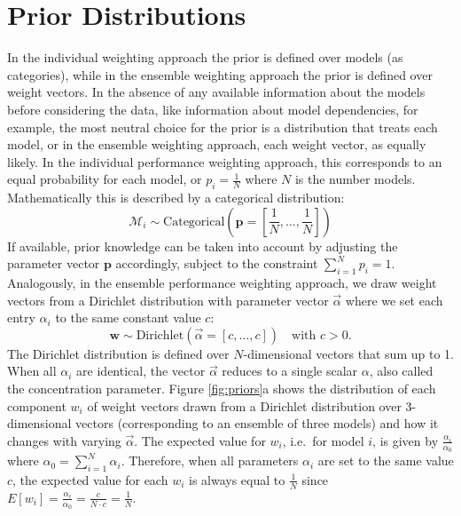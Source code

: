 \section{Prior Distributions}\label{sec:priors}
In the individual weighting approach the prior is defined over models (as categories), while in the ensemble weighting approach the prior is defined over weight vectors.
In the absence of any available information about the models before considering the data, like information about model dependencies, for example, the most neutral choice for the prior is a distribution that treats each model, or in the ensemble weighting approach, each weight vector, as equally likely.
In the individual performance weighting approach, this corresponds to an equal probability for each model, or $p_i = \frac{1}{N}$ where $N$ is the number models. Mathematically this is described by a categorical distribution:
\begin{equation}\label{eq:prior-individual} 
    \mathcal{M}_i \sim \textrm{Categorical}(\mathbf{p}=\left[\frac{1}{N},\dots,\frac{1}{N}\right])
\end{equation}
If available, prior knowledge can be taken into account by adjusting the parameter vector $\mathbf{p}$ accordingly, subject to the constraint $\sum_{i=1}^N p_i = 1$.
Analogously,  in the ensemble performance weighting approach, we draw weight vectors from a Dirichlet distribution with parameter vector $\vec{\alpha}$ where we set each entry $\alpha_i$ to the same constant value $c$:
\begin{equation}\label{eq:prior-ensemble}  
    \mathbf{w} \sim \textrm{Dirichlet}(\vec{\alpha} = \left[c,\dots,c\right]) \quad \textrm{with }  c>0.
\end{equation}
%
The Dirichlet distribution is defined over $N$-dimensional vectors that sum up to 1. 
When all $\alpha_i$ are identical, the vector $\vec{\alpha}$ reduces to a single scalar $\alpha$, also called the concentration parameter.
Figure \ref{fig:priors}a shows the distribution of each component $w_i$ of weight vectors drawn from a Dirichlet distribution over 3-dimensional vectors (corresponding to an ensemble of three models) and how it changes with varying $\vec{\alpha}$. 
The expected value for $w_i$, i.e.~for model $i$, is given by $\frac{\alpha_i}{\alpha_0}$ where $\alpha_0 = \sum_{i=1}^N \alpha_i$. Therefore, when all parameters $\alpha_i$ are set to the same value $c$, the expected value for each $w_i$ is always equal to $\frac{1}{N}$ since $E\left[w_i\right] = \frac{\alpha_i}{\alpha_0} = \frac{c}{N\cdot c} = \frac{1}{N}$. 
